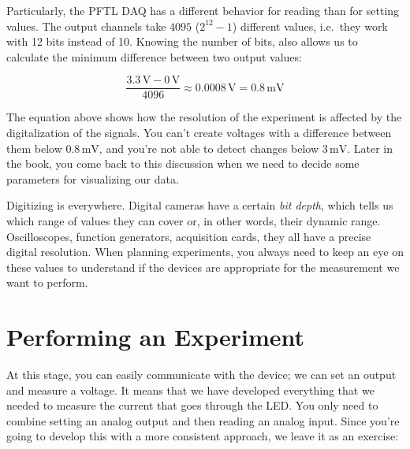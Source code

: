 Particularly, the {PFTL DAQ} has a different behavior for reading than for setting values. The output channels take $4095$ ($2^{12}-1$) different values, i.e.\ they work with 12 bits instead of 10. Knowing the number of bits, also allows us to calculate the minimum difference between two output values:

\begin{equation}
 \frac{3.3\,\textrm{V} - 0\,\textrm{V}}{4096} \approx 0.0008\,\textrm{V} = 0.8\,\textrm{mV}
\end{equation}

The equation above shows how the resolution of the experiment is affected by the digitalization of the signals. You can't create voltages with a difference between them below $0.8\,\textrm{mV}$, and you're not able to detect changes below $3\,\textrm{mV}$. Later in the book, you come back to this discussion when we need to decide some parameters for visualizing our data.

Digitizing is everywhere. Digital cameras have a certain \emph{bit depth}, which tells us which range of values they can cover or, in other words, their dynamic range. Oscilloscopes, function generators, acquisition cards, they all have a precise digital resolution. When planning experiments, you always need to keep an eye on these values to understand if the devices are appropriate for the measurement we want to perform.


\section{Performing an Experiment}\label{sec:doing-an-experiment}
At this stage, you can easily communicate with the device; we can set an output and measure a voltage. It means that we have developed everything that we needed to measure the current that goes through the LED. You only need to combine setting an analog output and then reading an analog input. Since you're going to develop this with a more consistent approach, we leave it as an exercise:


